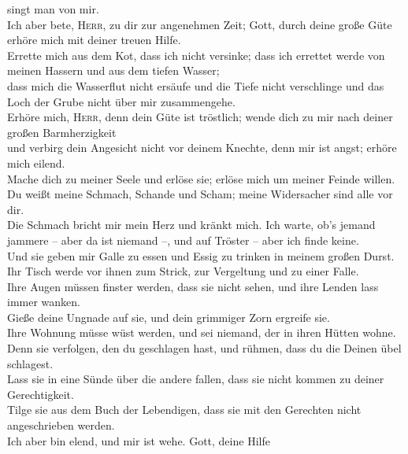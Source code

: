 singt man von mir.\\
 Ich aber bete, \textsc{Herr}, zu dir zur angenehmen
Zeit; Gott, durch deine große Güte erhöre mich mit deiner treuen
Hilfe.\\
 Errette mich aus dem Kot, dass ich nicht versinke; dass
ich errettet werde von meinen Hassern und aus dem tiefen Wasser;\\
 dass mich die Wasserflut nicht ersäufe und die Tiefe
nicht verschlinge und das Loch der Grube nicht über mir zusammengehe.\\
 Erhöre mich, \textsc{Herr}, denn dein Güte ist
tröstlich; wende dich zu mir nach deiner großen Barmherzigkeit\\
 und verbirg dein Angesicht nicht vor deinem Knechte,
denn mir ist angst; erhöre mich eilend.\\
 Mache dich zu meiner Seele und erlöse sie; erlöse mich
um meiner Feinde willen.\\
 Du weißt meine Schmach, Schande und Scham; meine
Widersacher sind alle vor dir.\\
 Die Schmach bricht mir mein Herz und kränkt mich. Ich
warte, ob's jemand jammere -- aber da ist niemand --, und auf Tröster --
aber ich finde keine.\\
 Und sie geben mir Galle zu essen und Essig zu trinken in
meinem großen Durst.\\
 Ihr Tisch werde vor ihnen zum Strick, zur Vergeltung und
zu einer Falle.\\
 Ihre Augen müssen finster werden, dass sie nicht sehen,
und ihre Lenden lass immer wanken.\\
 Gieße deine Ungnade auf sie, und dein grimmiger Zorn
ergreife sie.\\
 Ihre Wohnung müsse wüst werden, und sei niemand, der in
ihren Hütten wohne.\\
 Denn sie verfolgen, den du geschlagen hast, und rühmen,
dass du die Deinen übel schlagest.\\
 Lass sie in eine Sünde über die andere fallen, dass sie
nicht kommen zu deiner Gerechtigkeit.\\
 Tilge sie aus dem Buch der Lebendigen, dass sie mit den
Gerechten nicht angeschrieben werden.\\
 Ich aber bin elend, und mir ist wehe. Gott, deine Hilfe
